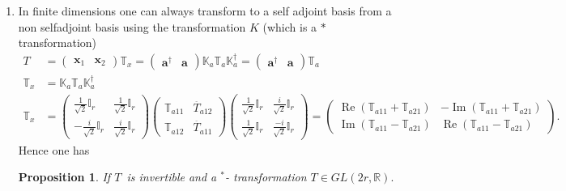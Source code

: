 \documentclass[aps, preprint]{revtex4}
\newtheorem{proposition}[theorem]{Proposition}
\begin{document}
\begin{enumerate}
\item In finite dimensions one can always transform to a self adjoint
basis from a non selfadjoint basis using the transformation $K$ (which is a $ \ast $ transformation)
\begin{align*}T &  =\left (\begin{array}{cc}\mathbf{x}_{1} & \mathbf{x}_{2}\end{array}\right ) \mathbb{T}_{x} =\left (\begin{array}{cc}\mathbf{a}^{ \dag } & \mathbf{a}\end{array}\right ) \mathbb{K}_{a} \mathbb{T}_{a} \mathbb{K}_{a}^{ \dag } =\left (\begin{array}{cc}\mathbf{a}^{ \dag } & \mathbf{a}\end{array}\right ) \mathbb{T}_{a} \\
\mathbb{T}_{x} &  =\mathbb{K}_{a} \mathbb{T}_{a} \mathbb{K}_{a}^{ \dag } \\
\mathbb{T}_{x} &  =\left (\begin{array}{cc}\frac{1}{\sqrt{2}} \mathbb{I}_{r} & \frac{1}{\sqrt{2}} \mathbb{I}_{r} \\
 -\frac{i}{\sqrt{2}} \mathbb{I}_{r} & \frac{i}{\sqrt{2}} \mathbb{I}_{r}\end{array}\right ) \left (\begin{array}{cc}\mathbb{T}_{a 1 1} & \overset{\underline{}}{T}_{a 1 2} \\
\mathbb{T}_{a 1 2} & \overset{\underline{}}{T}_{a 1 1}\end{array}\right ) \left (\begin{array}{cc}\frac{1}{\sqrt{2}} \mathbb{I}_{r} & \frac{i}{\sqrt{2}} \mathbb{I}_{r} \\
\frac{1}{\sqrt{2}} \mathbb{I}_{r} & \frac{ -i}{\sqrt{2}} \mathbb{I}_{r}\end{array}\right ) =\left (\begin{array}{cc}\ensuremath{\operatorname*{Re}} \left (\mathbb{T}_{a 1 1} +\mathbb{T}_{a 2 1}\right ) &  -\ensuremath{\operatorname*{Im}} \left (\mathbb{T}_{a 1 1} +\mathbb{T}_{a 2 1}\right ) \\
\ensuremath{\operatorname*{Im}} \left (\mathbb{T}_{a 1 1} -\mathbb{T}_{a 2 1}\right ) & \ensuremath{\operatorname*{Re}} \left (\mathbb{T}_{a 1 1} -\mathbb{T}_{a 2 1}\right )\end{array}\right )\text{.}\end{align*}Hence one has 


\begin{proposition}
\emph{If }$T$\emph{\ is invertible and a }$^{ \ast }$\emph{- transformation }$T \in G L \left (2 r ,\mathbb{R}\right )\text{.}$ 
\end{proposition}


\end{enumerate}
\end{document}
